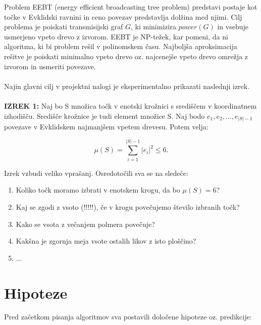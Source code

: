 \documentclass[a4paper]{report}
\begin{document}
Problem EEBT (energy efficient broadcasting tree problem) predstavi postaje kot točke v Evklidski ravnini in ceno povezav predstavlja dolžina med njimi. Cilj problema je poiskati transmisijski graf $G$, ki minimizira $power(G)$ in vsebuje usmerjeno vpeto drevo z izvorom. EEBT je NP-težek, kar pomeni, da ni algoritma, ki bi problem rešil v polinomskem času. Najboljša aproksimacija rešitve je poiskati minimalno vpeto drevo oz. najcenejše vpeto drevo omrežja z izvorom in usmeriti povezave.
\\
\\
Najin glavni cilj v projektni nalogi je eksperimentalno prikazati naslednji izrek.\\
\\
\textbf{IZREK 1:} Naj bo S množica točk v enotski krožnici s središčem v koordinatnem izhodišču. Središče krožnice je tudi element množice S. Naj bodo $e_1, e_2, \ldots, e_{|S|-1}$ povezave v Evklidskem najmanjšem vpetem drevesu. Potem velja: 

$$ \mu (S) = \sum_{i=1}^{|S|-1} |e_i|^2 \leq 6. $$

Izrek vzbudi veliko vprašanj. Osredotočili sva se na sledeče:
\begin{enumerate}
\item Koliko točk moramo izbrati v enotskem krogu, da bo $\mu (S) = 6$?
\item Kaj se zgodi z vsoto (!!!!!), če v krogu povečujemo število izbranih točk?
\item Kako se vsota z večanjem polmera povečuje?
\item Kakšna je zgornja meja vsote ostalih likov z isto ploščino?
\item ...
\end{enumerate}

\section{Hipoteze}

Pred začetkom pisanja algoritmov sva postavili določene hipoteze oz. predikcije:
\end{document}
